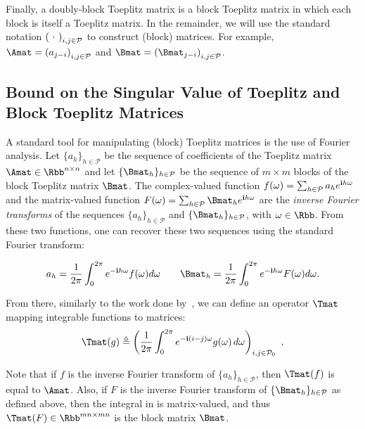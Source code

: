 Finally, a doubly-block Toeplitz matrix is a block Toeplitz matrix in which each block is itself a Toeplitz matrix.
In the remainder, we will use the standard notation $\leftmat\ \cdot\ \rightmat_{i,j \in \mathcal{P}}$ to construct (block) matrices.
For example, $\Amat = \leftmat a_{j-i} \rightmat_{i,j \in \mathcal{P}}$ and $\Bmat = \leftmat \Bmat_{j-i} \rightmat_{i,j \in \mathcal{P}}$.

\subsection{Bound on the Singular Value of Toeplitz and Block Toeplitz Matrices}
\label{subsection:ch5-bound_on_the_singular_value_of_toeplitz_and_block_toeplitz_matrices}

A standard tool for manipulating (block) Toeplitz matrices is the use of Fourier analysis.
Let $\{a_h\}_{h \in \mathcal{P}}$ be the sequence of coefficients of the Toeplitz matrix $\Amat \in \Rbb^{n\times n}$ and let $\{\Bmat_h\}_{h \in \mathcal{P}}$ be the sequence of $m\times m$ blocks of the block Toeplitz matrix $\Bmat$.
The complex-valued function $f(\omega) = \sum_{h \in \mathcal{P}} a_h e^{\mathbf{i} h \omega}$ and the matrix-valued function $F(\omega) = \sum_{h \in \mathcal{P}} \Bmat_h e^{\ci h \omega}$ are the \emph{inverse Fourier transforms} of the sequences $\{a_h\}_{h \in \mathcal{P}}$ and $\{\Bmat_h\}_{h \in \mathcal{P}}$, with $\omega \in \Rbb$.
From these two functions, one can recover these two sequences using the standard Fourier transform:

\begin{equation}
    a_h = \frac{1}{2\pi} \int_0^{2\pi} e^{-\ci h \omega} f(\omega) d\omega \quad \quad \Bmat_h = \frac{1}{2\pi} \int_0^{2\pi} e^{-\ci h \omega} F(\omega) d\omega .
\end{equation}

From there, similarly to the work done by~\citet{gray2006toeplitz,gutierrez2012block}, we can define an operator $\Tmat$ mapping integrable functions to matrices:
\begin{equation} \label{equation:expression_toeplitz_matrix}
  \Tmat(g)  \triangleq\leftmat\frac{1}{2\pi}\int_{0}^{2\pi}e^{-\ci(i-j)\omega}g(\omega)\,d\omega\rightmat_{i,j \in \mathcal{P}_0} \enspace.
\end{equation}

Note that if $f$ is the inverse Fourier transform of $\{a_h\}_{h \in \mathcal{P}}$, then $\Tmat(f)$ is equal to $\Amat$.
Also, if $F$ is the inverse Fourier transform of $\{\Bmat_h\}_{h \in \mathcal{P}}$ as defined above, then the integral in  is matrix-valued, and thus $\Tmat(F) \in \Rbb^{mn \times mn}$ is the block matrix $\Bmat$.

